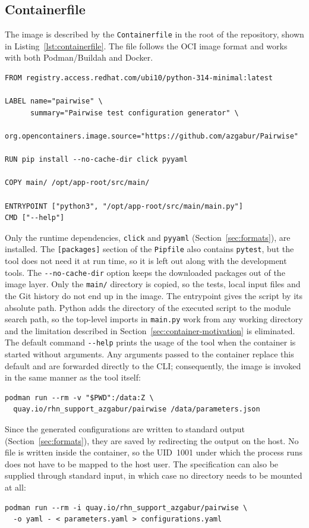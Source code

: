 \documentclass[
  digital, %
  oneside, %
  lof,     %
  nolot,     %
]{fithesis4}
\begin{document}
\subsection{Containerfile}
\label{sec:containerfile}
The image is described by the \texttt{Containerfile} in the root of the
repository, shown in Listing~\ref{lst:containerfile}. The file follows the
\gls{OCI} image format and works with both Podman/Buildah and Docker.
%
\begin{lstlisting}[caption={Containerfile of the generator.},label={lst:containerfile}]
FROM registry.access.redhat.com/ubi10/python-314-minimal:latest

LABEL name="pairwise" \
      summary="Pairwise test configuration generator" \
      org.opencontainers.image.source="https://github.com/azgabur/Pairwise"

RUN pip install --no-cache-dir click pyyaml

COPY main/ /opt/app-root/src/main/

ENTRYPOINT ["python3", "/opt/app-root/src/main/main.py"]
CMD ["--help"]
\end{lstlisting}
%
Only the runtime dependencies, \texttt{click} and \texttt{pyyaml}
(Section~\ref{sec:formats}), are installed. The
\texttt{[packages]} section of the \texttt{Pipfile} also contains
\texttt{pytest}, but the tool does not need it at run time, so it is left out
along with the development tools. The \texttt{-{}-no-cache-dir} option keeps the
downloaded packages out of the image layer. Only the \texttt{main/} directory is
copied, so the tests, local input files and the Git history do not end up in the
image. The entrypoint gives the script by its absolute path. Python adds the
directory of the executed script to the module search path, so the top-level
imports in \texttt{main.py} work from any working directory and the limitation
described in Section~\ref{sec:container-motivation} is eliminated. The default
command \texttt{-{}-help} prints the usage of the tool when the container is
started without arguments. Any arguments passed to the container replace this
default and are forwarded directly to the \gls{CLI}; consequently, the image is
invoked in the same manner as the tool itself:
%
\begin{lstlisting}[caption={Running the generator from the container image.},label={lst:container-run}]
podman run --rm -v "$PWD":/data:Z \
  quay.io/rhn_support_azgabur/pairwise /data/parameters.json
\end{lstlisting}
%
Since the generated configurations are written to standard output
(Section~\ref{sec:formats}), they are saved by redirecting the output on the
host. No file is written inside the container, so the \gls{UID}~1001 under
which the process runs does not have to be mapped to the host user. The
specification can also be supplied through standard input, in which case no
directory needs to be mounted at all:
%
\begin{lstlisting}[caption={Running the generator with standard input and output.},label={lst:container-stdio}]
podman run --rm -i quay.io/rhn_support_azgabur/pairwise \
  -o yaml - < parameters.yaml > configurations.yaml
\end{lstlisting}
\end{document}
